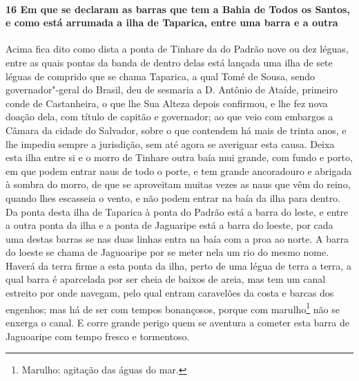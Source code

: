 \begin{linenumbers}
\paragraph{16 Em que se declaram as barras que tem a Bahia de Todos os Santos, e como está
arrumada a ilha de Taparica, entre uma barra e a outra} \quad
Acima fica dito como dista a ponta de Tinhare da do Padrão nove ou dez léguas, entre as
quais pontas da banda de dentro delas está lançada uma ilha de sete léguas de comprido que
se chama Taparica, a qual Tomé de Sousa, sendo governador"-geral do Brasil, deu de sesmaria
a D. Antônio de Ataíde, primeiro conde de Castanheira, o que lhe Sua Alteza depois
confirmou, e lhe fez nova doação dela, com título de capitão e governador; ao que veio com
embargos a Câmara da cidade do Salvador, sobre o que contendem há mais de trinta anos, e
lhe impediu sempre a jurisdição, sem até agora se averiguar esta causa. Deixa esta ilha
entre si e o morro de Tinhare outra baía mui grande, com fundo e porto, em que podem
entrar naus de todo o porte, e tem grande ancoradouro e abrigada à sombra do morro, de que
se aproveitam muitas vezes as naus que vêm do reino, quando lhes escasseia o vento, e não
podem entrar na baía da ilha para dentro. Da ponta desta ilha de Taparica à ponta do
Padrão está a barra do leste, e entre a outra ponta da ilha e a 
ponta de Jaguaripe está a barra do loeste, por cada uma destas barras se 
nas duas linhas entra na baía com a proa ao norte. A barra do loeste se chama de Jaguoaripe
por se meter nela um rio do mesmo nome. Haverá da terra firme a esta ponta da ilha, perto
de uma légua de terra a terra, a qual barra é aparcelada por ser cheia de baixos de areia,
mas tem um canal estreito por onde navegam, pelo qual entram caravelões da costa e barcas
dos engenhos; mas há de ser com tempos bonançosos, porque com marulho\footnote{ Marulho:
agitação das águas do mar.} não se enxerga o canal. E corre grande perigo quem se aventura
a cometer esta barra de Jaguoaripe com tempo fresco e tormentoso.


\end{linenumbers}
